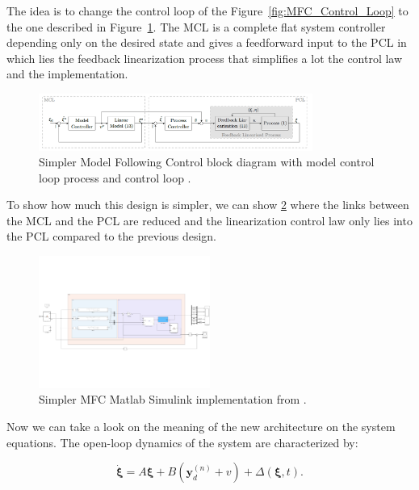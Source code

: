 The idea is to change the control loop of the Figure~\ref{fig:MFC_Control_Loop} to the one described in 
Figure~\ref{fig:Simpler_MFC_Control_Loop}. The MCL is a complete flat system controller depending only on 
the desired state and gives a feedforward input to the PCL in which lies the feedback linearization process
that simplifies a lot the control law and the implementation.

\begin{figure}[htbp]
    \centering
    \includegraphics[width=0.8\textwidth]{imgs/section1/MFCEfficient.PNG}
    \caption{Simpler Model Following Control block diagram with model control loop process and control loop \cite{Tietze2023CruiseControl}.}
    \label{fig:Simpler_MFC_Control_Loop}
\end{figure}

To show how much this design is simpler, we can show \ref{fig:Simpler_MFC_Control_Loop_block} where the 
links between the MCL and the PCL are reduced and the linearization control law only lies into the PCL compared 
to the previous design.


\begin{figure}[htbp]
    \centering
    \includegraphics[width=0.5\textwidth]{imgs/section1/MFC_efficient_model.pdf}
    \caption{Simpler MFC Matlab Simulink implementation from \cite{Tietze2023CruiseControl}.}
    \label{fig:Simpler_MFC_Control_Loop_block}
\end{figure}

Now we can take a look on the meaning of the new architecture on the system equations.
The open-loop dynamics of the system are characterized by:

\begin{equation}
    \dot{\boldsymbol{\xi}} = A\boldsymbol{\xi} + B(\boldsymbol{y}_d^{(n)} + v) + \Delta(\boldsymbol{\xi}, t).
\end{equation}


